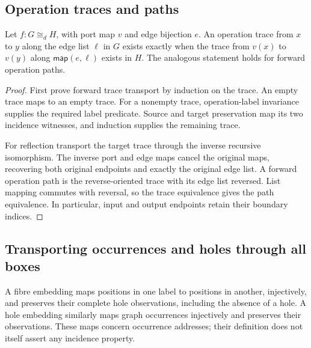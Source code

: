 \subsection{Operation traces and paths}

\begin{theorem}
Let $f:G\cong_d H$, with port map $v$ and edge bijection $e$. An operation trace
from $x$ to $y$ along the edge list $\ell$ in $G$ exists exactly when the trace
from $v(x)$ to $v(y)$ along $\mathsf{map}(e,\ell)$ exists in $H$. The analogous
statement holds for forward operation paths.
\end{theorem}
\begin{proof}
First prove forward trace transport by induction on the trace. An empty trace
maps to an empty trace. For a nonempty trace, operation-label invariance supplies
the required label predicate. Source and target preservation map its two
incidence witnesses, and induction supplies the remaining trace.

For reflection transport the target trace through the inverse recursive
isomorphism. The inverse port and edge maps cancel the original maps, recovering
both original endpoints and exactly the original edge list. A forward operation
path is the reverse-oriented trace with its edge list reversed. List mapping
commutes with reversal, so the trace equivalence gives the path equivalence.
In particular, input and output endpoints retain their boundary indices.
\end{proof}

\subsection{Transporting occurrences and holes through all boxes}

\begin{definition}\label{term:hole-embedding}
A fibre embedding maps positions in one label to positions in another,
injectively, and preserves their complete hole observations, including the
absence of a hole. A hole embedding similarly maps graph occurrences
injectively and preserves their observations. These maps concern occurrence
addresses; their definition does not itself assert any incidence property.
\end{definition}

